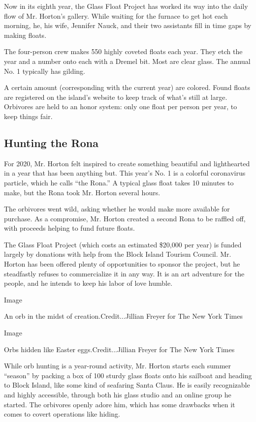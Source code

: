 Now in its eighth year, the Glass Float Project has worked its way into
the daily flow of Mr. Horton's gallery. While waiting for the furnace to
get hot each morning, he, his wife, Jennifer Nauck, and their two
assistants fill in time gaps by making floats.

The four-person crew makes 550 highly coveted floats each year. They
etch the year and a number onto each with a Dremel bit. Most are clear
glass. The annual No. 1 typically has gilding.

A certain amount (corresponding with the current year) are colored.
Found floats are registered on the island's website to keep track of
what's still at large. Orbivores are held to an honor system: only one
float per person per year, to keep things fair.

\hypertarget{hunting-the-rona}{%
\subsection{Hunting the Rona}\label{hunting-the-rona}}

For 2020, Mr. Horton felt inspired to create something beautiful and
lighthearted in a year that has been anything but. This year's No. 1 is
a colorful coronavirus particle, which he calls ``the Rona.'' A typical
glass float takes 10 minutes to make, but the Rona took Mr. Horton
several hours.

The orbivores went wild, asking whether he would make more available for
purchase. As a compromise, Mr. Horton created a second Rona to be
raffled off, with proceeds helping to fund future floats.

The Glass Float Project (which costs an estimated \$20,000 per year) is
funded largely by donations with help from the Block Island Tourism
Council. Mr. Horton has been offered plenty of opportunities to sponsor
the project, but he steadfastly refuses to commercialize it in any way.
It is an art adventure for the people, and he intends to keep his labor
of love humble.

Image

An orb in the midst of creation.Credit...Jillian Freyer for The New York
Times

Image

Orbs hidden like Easter eggs.Credit...Jillian Freyer for The New York
Times

While orb hunting is a year-round activity, Mr. Horton starts each
summer ``season'' by packing a box of 100 sturdy glass floats onto his
sailboat and heading to Block Island, like some kind of seafaring Santa
Claus. He is easily recognizable and highly accessible, through both his
glass studio and an online group he started. The orbivores openly adore
him, which has some drawbacks when it comes to covert operations like
hiding.

